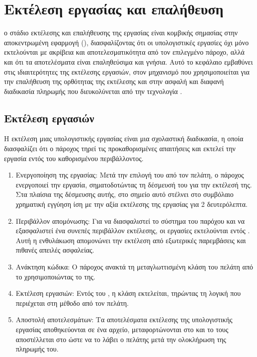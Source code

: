 \chapter{Εκτέλεση εργασίας και επαλήθευση}
 ο στάδιο εκτέλεσης και επαλήθευσης της εργασίας είναι κομβικής σημασίας στην αποκεντρωμένη εφαρμογή (), διασφαλίζοντας ότι οι υπολογιστικές εργασίες όχι μόνο εκτελούνται με ακρίβεια και αποτελεσματικότητα από τον επιλεγμένο πάροχο, αλλά και ότι τα αποτελέσματα είναι επαληθεύσιμα και γνήσια. Αυτό το κεφάλαιο εμβαθύνει στις ιδιαιτερότητες της εκτέλεσης εργασιών, στον μηχανισμό που χρησιμοποιείται για την επαλήθευση της ορθότητας της εκτέλεσης και στην ασφαλή και διαφανή διαδικασία πληρωμής που διευκολύνεται από την τεχνολογία .


\section{Εκτέλεση εργασιών}
Η εκτέλεση μιας υπολογιστικής εργασίας είναι μια σχολαστική διαδικασία, η οποία διασφαλίζει ότι ο πάροχος τηρεί τις προκαθορισμένες απαιτήσεις και εκτελεί την εργασία εντός του καθορισμένου περιβάλλοντος.
\begin{enumerate}
    \item Ενεργοποίηση της εργασίας: Μετά την επιλογή του από τον πελάτη, ο πάροχος ενεργοποιεί την εργασία, σηματοδοτώντας τη δέσμευσή του για την εκτέλεσή της. Στα πλαίσια της δέσμευσης αυτής, στο σημείο αυτό στέλνει στο συμβόλαιο χρηματική εγγύηση ίση με την αξία εκτέλεσης της εργασίας για 2 δευτερόλεπτα.
    \item Περιβάλλον απομόνωσης: Για να διασφαλιστεί το σύστημα του παρόχου και να εξασφαλιστεί ένα συνεπές περιβάλλον εκτέλεσης, οι εργασίες εκτελούνται εντός . Αυτή η ενθυλάκωση απομονώνει την εκτέλεση από εξωτερικές παρεμβάσεις και πιθανές απειλές ασφαλείας.
    \item Ανάκτηση κώδικα: Ο πάροχος ανακτά τη μεταγλωττισμένη κλάση  του πελάτη από το  χρησιμοποιώντας το  της.
    \item Εκτέλεση εργασιών: Εντός του , η κλάση  εκτελείται, τηρώντας τη λογική που περιέχεται στη μέθοδο \textit{} από τον πελάτη.
    \item Αποστολή αποτελεσμάτων: Τα αποτελέσματα εκτέλεσης της υπολογιστικής εργασίας αποθηκεύονται σε ένα αρχείο, μεταφορτώνονται στο  και το  τους αποστέλλεται στο  ώστε να το λάβει ο πελάτης μετά την ολοκλήρωση της πληρωμής του.
\end{enumerate}

